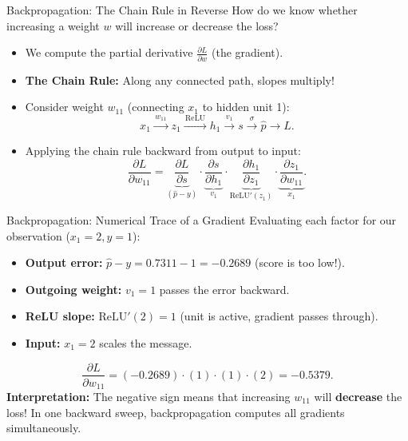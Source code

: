 \begin{frame}{Backpropagation: The Chain Rule in Reverse}
    How do we know whether increasing a weight $w$ will increase or decrease the loss?
    \begin{itemize}
        \item We compute the partial derivative $\frac{\partial L}{\partial w}$ (the gradient).
        \item \textbf{The Chain Rule:} Along any connected path, slopes multiply!
        \item Consider weight $w_{11}$ (connecting $x_1$ to hidden unit 1):
        \[
            x_1 \xrightarrow{\,w_{11}\,} z_1 \xrightarrow{\,\mathrm{ReLU}\,} h_1 \xrightarrow{\,v_1\,} s \xrightarrow{\,\sigma\,} \hat{p} \longrightarrow L.
        \]
        \item Applying the chain rule backward from output to input:
        \[
            \frac{\partial L}{\partial w_{11}} =
            \underbrace{\frac{\partial L}{\partial s}}_{(\hat{p} - y)} \cdot
            \underbrace{\frac{\partial s}{\partial h_1}}_{v_1} \cdot
            \underbrace{\frac{\partial h_1}{\partial z_1}}_{\mathrm{ReLU}'(z_1)} \cdot
            \underbrace{\frac{\partial z_1}{\partial w_{11}}}_{x_1}.
        \]
    \end{itemize}
\end{frame}

\begin{frame}{Backpropagation: Numerical Trace of a Gradient}
    Evaluating each factor for our observation ($x_1=2, y=1$):
    \begin{itemize}
        \item \textbf{Output error:} $\hat{p} - y = 0.7311 - 1 = \mathbf{-0.2689}$ (score is too low!).
        \item \textbf{Outgoing weight:} $v_1 = 1$ passes the error backward.
        \item \textbf{ReLU slope:} $\mathrm{ReLU}'(2) = 1$ (unit is active, gradient passes through).
        \item \textbf{Input:} $x_1 = 2$ scales the message.
    \end{itemize}
    \[
        \frac{\partial L}{\partial w_{11}} = (-0.2689) \cdot (1) \cdot (1) \cdot (2) = \mathbf{-0.5379}.
    \]
    \pause
    \textbf{Interpretation:} The negative sign means that increasing $w_{11}$ will \textbf{decrease} the loss! In one backward sweep, backpropagation computes all gradients simultaneously.
\end{frame}

